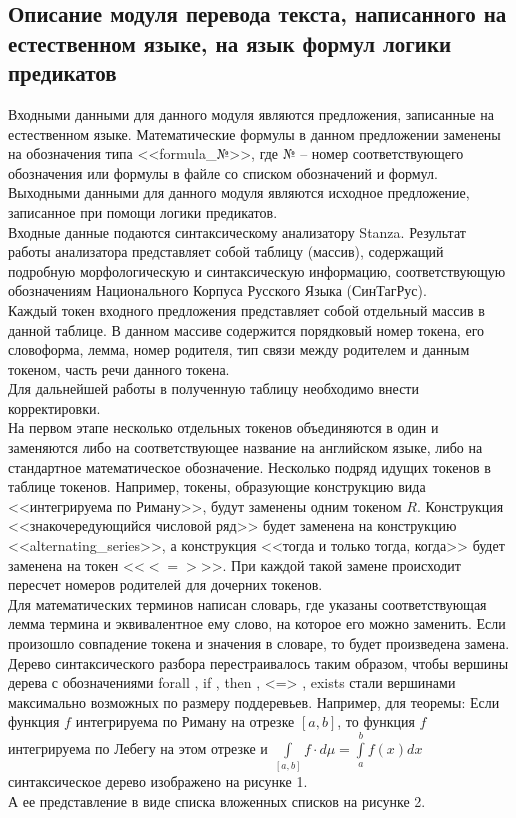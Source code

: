 \documentclass[12pt]{article}
\begin{document}
\subsection{Описание модуля перевода текста, написанного на естественном языке, на язык формул логики предикатов}
Входными данными для данного модуля являются предложения, записанные на естественном языке.  Математические формулы в данном предложении заменены на обозначения типа <<formula\_№>>, где № -- номер соответствующего обозначения или формулы в файле со списком обозначений и формул. Выходными данными для данного модуля являются исходное предложение, записанное при помощи логики предикатов.\\

Входные данные подаются синтаксическому анализатору Stanza. Результат работы анализатора представляет собой  таблицу (массив), содержащий подробную морфологическую и синтаксическую информацию, соответствующую обозначениям Национального Корпуса Русского Языка (СинТагРус).\\

Каждый токен входного предложения представляет собой отдельный массив в данной таблице. В данном массиве содержится порядковый номер токена, его словоформа, лемма, номер родителя, тип связи между родителем и данным токеном, часть речи данного токена. \\

Для дальнейшей работы в полученную таблицу необходимо внести корректировки. \\

На первом этапе несколько отдельных токенов объединяются в один и заменяются либо на соответствующее название на английском языке, либо на стандартное математическое обозначение. Несколько подряд идущих токенов в таблице токенов. Например, токены, образующие конструкцию вида <<интегрируема по Риману>>, будут заменены одним токеном $R$. Конструкция <<знакочередующийся числовой ряд>> будет заменена на конструкцию <<alternating\_series>>, а конструкция <<тогда и только тогда, когда>> будет заменена на токен <<$<=>$>>. При каждой такой замене происходит пересчет номеров родителей для дочерних токенов.\\

Для математических терминов написан словарь, где указаны соответствующая лемма термина и эквивалентное ему слово, на которое его можно заменить. Если произошло совпадение токена и значения в словаре, то будет произведена замена.  \\

Дерево синтаксического разбора перестраивалось таким образом, чтобы вершины дерева с обозначениями forall , if , then , <=> , exists стали вершинами максимально возможных по размеру поддеревьев. Например, для теоремы: Если функция ${\displaystyle f}$ интегрируема по Риману на отрезке ${\displaystyle [a,b]}$, то функция ${\displaystyle f}$ интегрируема по Лебегу на этом отрезке и ${\displaystyle \int \limits _{[a,b]} f \cdot d\mu=\int \limits _{a}^{b} f(x) dx}$ синтаксическое дерево изображено на рисунке 1.\\
А ее представление в виде списка вложенных списков на рисунке 2.\\
\end{document}
